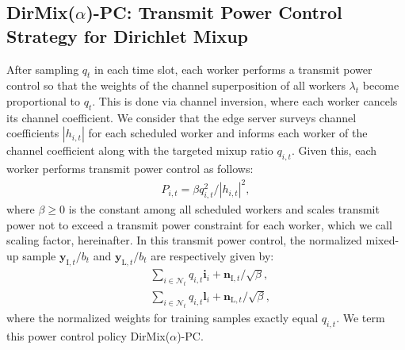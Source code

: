 \documentclass[conference,10pt]{IEEEtran}
\theoremstyle{definition}
\theoremstyle{definition}
\begin{document}
\subsection{DirMix($\alpha$)-PC: Transmit Power Control Strategy for Dirichlet Mixup}
After sampling $q_t$ in each time slot, each worker performs a transmit power control so that the weights of the channel superposition of all workers $\lambda_t$ become proportional to $q_t$.
This is done via channel inversion, where each worker cancels its channel coefficient.
We consider that the edge server surveys channel coefficients $|h_{i, t}|$ for each scheduled worker and informs each worker of the channel coefficient along with the targeted mixup ratio $q_{i, t}$.
Given this, each worker performs transmit power control as follows:
\begin{align}
	\label{eq:transmit_power}
	\textstyle P_{i, t} = {\beta}q_{i, t}^2 / {|h_{i, t}|^2},
\end{align}
where $\beta\geq 0$ is the constant among all scheduled workers and scales transmit power not to exceed a transmit power constraint for each worker, which we call scaling factor, hereinafter.
In this transmit power control, the normalized mixed-up sample $\bm y_{\mathrm{I}, t}/b_t$ and $\bm y_{\mathrm{L}, t}/b_t$ are respectively given by:
\begin{align}
	 & \textstyle\sum_{i\in\mathcal{N}_t} q_{i, t}\bm{i}_i + {\bm n_{\mathrm{I}, t}}/{\sqrt{\beta}}, \label{eq:DirPC_input_sample} \\
	 & \textstyle\sum_{i\in\mathcal{N}_t} q_{i, t}\bm{l}_i + {\bm n_{\mathrm{L}, t}}/{\sqrt{\beta}}, \label{eq:DirPC_label_sample}
\end{align}
where the normalized weights for training samples exactly equal $q_{i, t}$.
We term this power control policy \textsf{DirMix($\alpha$)-PC}.

\end{document}
